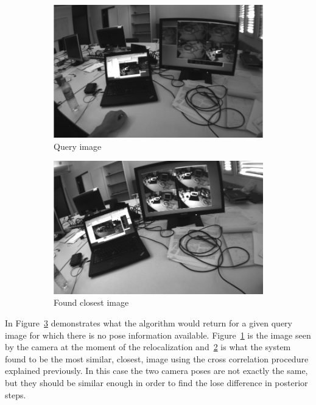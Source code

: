 \begin{figure}[!htpb]
  \centering
  \begin{subfigure}[b]{11cm}
    \includegraphics[width=\linewidth]{img/query_1.png}
    \caption{Query image}
    \label{fig:query_1}
  \end{subfigure}

  \begin{subfigure}[b]{11cm}
    \includegraphics[width=\linewidth]{img/best_match_1.png}
    \caption{Found closest image}
    \label{fig:best_match_1}
  \end{subfigure}
  \caption{}
  \label{fig:cc_example}
\end{figure}


In Figure~\ref{fig:cc_example} demonstrates what the algorithm would return for a given query image for which there is no pose information available. Figure~\ref{fig:query_1} is the image seen by the camera at the moment of the relocalization and~\ref{fig:best_match_1} is what the system found to be the most similar, closest, image using the cross correlation procedure explained previously. In this case the two camera poses are not exactly the same, but they should be similar enough in order to find the lose difference in posterior steps.\\

